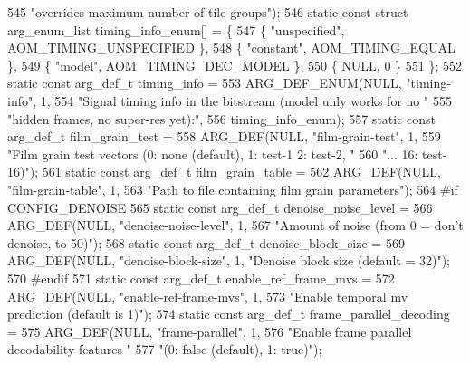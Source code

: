 \begin{DoxyCodeInclude}
{{{{{{{545             \textcolor{stringliteral}{"overrides maximum number of tile groups"});
546 \textcolor{keyword}{static} \textcolor{keyword}{const} \textcolor{keyword}{struct }arg\_enum\_list timing\_info\_enum[] = \{
547   \{ \textcolor{stringliteral}{"unspecified"}, AOM\_TIMING\_UNSPECIFIED \},
548   \{ \textcolor{stringliteral}{"constant"}, AOM\_TIMING\_EQUAL \},
549   \{ \textcolor{stringliteral}{"model"}, AOM\_TIMING\_DEC\_MODEL \},
550   \{ NULL, 0 \}
551 \};
552 \textcolor{keyword}{static} \textcolor{keyword}{const} arg\_def\_t timing\_info =
553     ARG\_DEF\_ENUM(NULL, \textcolor{stringliteral}{"timing-info"}, 1,
554                  \textcolor{stringliteral}{"Signal timing info in the bitstream (model unly works for no "}
555                  \textcolor{stringliteral}{"hidden frames, no super-res yet):"},
556                  timing\_info\_enum);
557 \textcolor{keyword}{static} \textcolor{keyword}{const} arg\_def\_t film\_grain\_test =
558     ARG\_DEF(NULL, \textcolor{stringliteral}{"film-grain-test"}, 1,
559             \textcolor{stringliteral}{"Film grain test vectors (0: none (default), 1: test-1  2: test-2, "}
560             \textcolor{stringliteral}{"... 16: test-16)"});
561 \textcolor{keyword}{static} \textcolor{keyword}{const} arg\_def\_t film\_grain\_table =
562     ARG\_DEF(NULL, \textcolor{stringliteral}{"film-grain-table"}, 1,
563             \textcolor{stringliteral}{"Path to file containing film grain parameters"});
564 \textcolor{preprocessor}{#if CONFIG\_DENOISE}
565 \textcolor{keyword}{static} \textcolor{keyword}{const} arg\_def\_t denoise\_noise\_level =
566     ARG\_DEF(NULL, \textcolor{stringliteral}{"denoise-noise-level"}, 1,
567             \textcolor{stringliteral}{"Amount of noise (from 0 = don't denoise, to 50)"});
568 \textcolor{keyword}{static} \textcolor{keyword}{const} arg\_def\_t denoise\_block\_size =
569     ARG\_DEF(NULL, \textcolor{stringliteral}{"denoise-block-size"}, 1, \textcolor{stringliteral}{"Denoise block size (default = 32)"});
570 \textcolor{preprocessor}{#endif}
571 \textcolor{keyword}{static} \textcolor{keyword}{const} arg\_def\_t enable\_ref\_frame\_mvs =
572     ARG\_DEF(NULL, \textcolor{stringliteral}{"enable-ref-frame-mvs"}, 1,
573             \textcolor{stringliteral}{"Enable temporal mv prediction (default is 1)"});
574 \textcolor{keyword}{static} \textcolor{keyword}{const} arg\_def\_t frame\_parallel\_decoding =
575     ARG\_DEF(NULL, \textcolor{stringliteral}{"frame-parallel"}, 1,
576             \textcolor{stringliteral}{"Enable frame parallel decodability features "}
577             \textcolor{stringliteral}{"(0: false (default), 1: true)"});
}}}}}}}
\end{DoxyCodeInclude}
